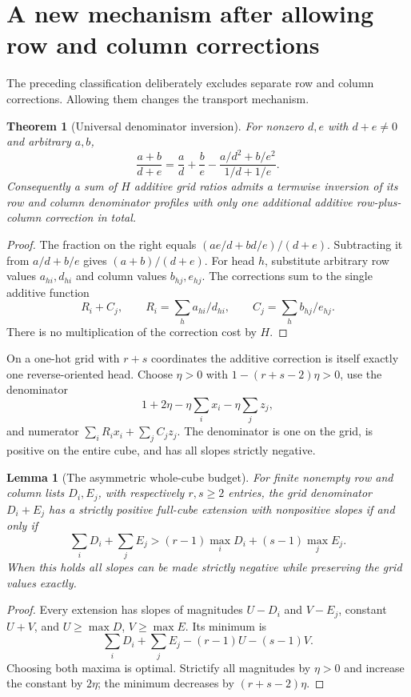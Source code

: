 \documentclass[11pt]{article}
\newtheorem{theorem}{Theorem}
\newtheorem{lemma}{Lemma}
\begin{document}
\section{A new mechanism after allowing row and column corrections}

The preceding classification deliberately excludes separate row and
column corrections. Allowing them changes the transport mechanism.

\begin{theorem}[Universal denominator inversion]
For nonzero $d,e$ with $d+e\ne0$ and arbitrary $a,b$,
\[
 \frac{a+b}{d+e}
 =\frac a d+\frac b e
   -\frac{a/d^2+b/e^2}{1/d+1/e}.
\]
Consequently a sum of $H$ additive grid ratios admits a termwise
inversion of its row and column denominator profiles with only one
additional additive row-plus-column correction in total.
\end{theorem}

\begin{proof}
The fraction on the right equals
$(ae/d+bd/e)/(d+e)$. Subtracting it from $a/d+b/e$ gives
$(a+b)/(d+e)$. For head $h$, substitute arbitrary row values
$a_{hi},d_{hi}$ and column values $b_{hj},e_{hj}$. The corrections
sum to the single additive function
\[
 R_i+C_j,
 \qquad R_i=\sum_h a_{hi}/d_{hi},
 \qquad C_j=\sum_h b_{hj}/e_{hj}.
\]
There is no multiplication of the correction cost by $H$.
\end{proof}

On a one-hot grid with $r+s$ coordinates the additive correction is
itself exactly one reverse-oriented head. Choose $\eta>0$ with
$1-(r+s-2)\eta>0$, use the denominator
\[
 1+2\eta-\eta\sum_i x_i-\eta\sum_j z_j,
\]
and numerator $\sum_iR_ix_i+\sum_jC_jz_j$. The denominator is one
on the grid, is positive on the entire cube, and has all slopes
strictly negative.

\begin{lemma}[The asymmetric whole-cube budget]
For finite nonempty row and column lists $D_i,E_j$, with respectively
$r,s\ge2$ entries, the grid denominator $D_i+E_j$ has a strictly
positive full-cube extension with nonpositive slopes if and only if
\[
 \sum_iD_i+\sum_jE_j
   >(r-1)\max_iD_i+(s-1)\max_jE_j.
\]
When this holds all slopes can be made strictly negative while
preserving the grid values exactly.
\end{lemma}

\begin{proof}
Every extension has slopes of magnitudes $U-D_i$ and $V-E_j$,
constant $U+V$, and $U\ge\max D$, $V\ge\max E$. Its minimum is
\[
 \sum_iD_i+\sum_jE_j-(r-1)U-(s-1)V.
\]
Choosing both maxima is optimal. Strictify all magnitudes by
$\eta>0$ and increase the constant by $2\eta$; the minimum decreases
by $(r+s-2)\eta$.
\end{proof}
\end{document}
